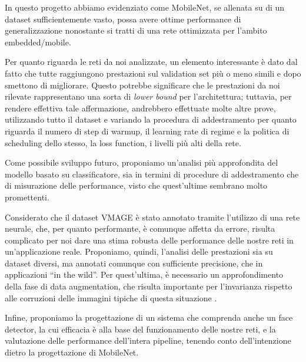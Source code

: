\begin{comment}
Riportare nella relazione le conclusioni del lavoro svolto.

- MobileNet funziona bene dal punto di vista del MAE nonostante sia stata ottimizzata per una specifica applicazione (utilizzo mobile/embedded, low power etc.)
- Tutte le reti arrivano ad un certo punto più o meno simile e si fermano: potremmo aver trovato un limite, ma per saperlo bisognerebbe fare più prove, cambiando tecnica di warmup, riduzione del LR, loss function etc.
- Il classificatore merita attenzioni
- Sarebbe interessante testare la rete su di un dataset annotato con le età esatte ma da umani anziché da una rete neurale
- Sarebbe interessante testarla in the wild, per valutare l'efficacia della data augmentation 
- Si possono valutare le prestazioini insieme ad un face detector
\end{comment}


In questo progetto abbiamo evidenziato come MobileNet, se allenata su di un dataset sufficientemente vasto, possa avere ottime performance di generalizzazione nonostante si tratti di una rete ottimizzata per l'ambito embedded/mobile.

Per quanto riguarda le reti da noi analizzate, un elemento interessante è dato dal fatto che tutte raggiungono prestazioni sul validation set più o meno simili e dopo smettono di migliorare. Questo potrebbe significare che le prestazioni da noi rilevate rappresentano una sorta di \emph{lower bound} per l'architettura; tuttavia, per rendere effettiva tale affermazione, andrebbero effettuate molte altre prove, utilizzando tutto il dataset e variando la procedura di addestramento per quanto riguarda il numero di step di warmup, il learning rate di regime e la politica di scheduling dello stesso, la loss function, i livelli più alti della rete.

Come possibile sviluppo futuro, proponiamo un'analisi più approfondita del modello basato su classificatore, sia in termini di procedure di addestramento che di misurazione delle performance, visto che quest'ultime sembrano molto promettenti.

Considerato che il dataset VMAGE è stato annotato tramite l'utilizzo di una rete neurale, che, per quanto performante, è comunque affetta da errore, risulta complicato per noi dare una stima robusta delle performance delle nostre reti in un'applicazione reale. Proponiamo, quindi, l'analisi delle prestazioni sia su dataset diversi, ma annotati comunque con sufficiente precisione, che in applicazioni ``in the wild''. Per quest'ultima, è necessario un approfondimento della fase di data augmentation, che risulta importante per l'invarianza rispetto alle corruzioni delle immagini tipiche di questa situazione \cite{miviagender}.

Infine, proponiamo la progettazione di un sistema che comprenda anche un face detector, la cui efficacia è alla base del funzionamento delle nostre reti, e la valutazione delle performance dell'intera pipeline, tenendo conto dell'intenzione dietro la progettazione di MobileNet.

